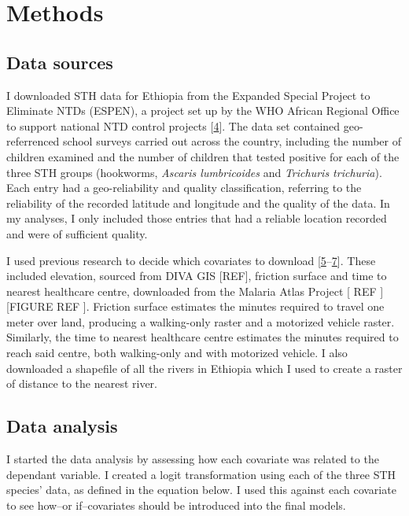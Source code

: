 \documentclass[
]{article}
\begin{document}
\hypertarget{methods}{%
\section{Methods}\label{methods}}

\hypertarget{data-sources}{%
\subsection{Data sources}\label{data-sources}}

I downloaded STH data for Ethiopia from the Expanded Special Project to
Eliminate NTDs (ESPEN), a project set up by the WHO African Regional
Office to support national NTD control projects
{[}\protect\hyperlink{ref-ESPENExpandedSpecial}{4}{]}. The data set
contained geo-referrenced school surveys carried out across the country,
including the number of children examined and the number of children
that tested positive for each of the three STH groups (hookworms,
\emph{Ascaris lumbricoides} and \emph{Trichuris trichuria}). Each entry
had a geo-reliability and quality classification, referring to the
reliability of the recorded latitude and longitude and the quality of
the data. In my analyses, I only included those entries that had a
reliable location recorded and were of sufficient quality.

I used previous research to decide which covariates to download
{[}\protect\hyperlink{ref-alelignSoilTransmittedHelminthInfections2015}{5}--\protect\hyperlink{ref-eyayuPrevalenceIntensityInfection2022}{7}{]}.
These included elevation, sourced from DIVA GIS {[}REF{]}, friction
surface and time to nearest healthcare centre, downloaded from the
Malaria Atlas Project {[} REF {]} {[}FIGURE REF {]}. Friction surface
estimates the minutes required to travel one meter over land, producing
a walking-only raster and a motorized vehicle raster. Similarly, the
time to nearest healthcare centre estimates the minutes required to
reach said centre, both walking-only and with motorized vehicle. I also
downloaded a shapefile of all the rivers in Ethiopia which I used to
create a raster of distance to the nearest river.

\hypertarget{data-analysis}{%
\subsection{Data analysis}\label{data-analysis}}

I started the data analysis by assessing how each covariate was related
to the dependant variable. I created a logit transformation using each
of the three STH species' data, as defined in the equation below. I used
this against each covariate to see how--or if--covariates should be
introduced into the final models.
\end{document}
